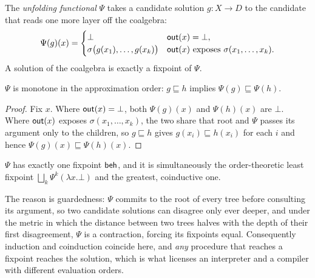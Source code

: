 \begin{definition}\label{def:unfolding}
  The \emph{unfolding functional} $\Psi$ takes a candidate solution $g \colon X \to D$ to the candidate that reads one more layer off the coalgebra:
  \[
    \Psi(g)(x) =
    \begin{cases}
      \bot & \mathsf{out}(x) = \bot,\\
      \sigma\big(g(x_1), \dots, g(x_k)\big) & \mathsf{out}(x) \text{ exposes } \sigma(x_1, \dots, x_k).
    \end{cases}
  \]
  A solution of the coalgebra is exactly a fixpoint of $\Psi$.
\end{definition}

\begin{lemma}\label{lem:mono-coalgebra}
  $\Psi$ is monotone in the approximation order: $g \sqsubseteq h$ implies $\Psi(g) \sqsubseteq \Psi(h)$.
\end{lemma}
\begin{proof}
  Fix $x$. Where $\mathsf{out}(x) = \bot$, both $\Psi(g)(x)$ and $\Psi(h)(x)$ are $\bot$. Where $\mathsf{out}(x)$ exposes $\sigma(x_1, \dots, x_k)$, the two share that root and $\Psi$ passes its argument only to the children, so $g \sqsubseteq h$ gives $g(x_i) \sqsubseteq h(x_i)$ for each $i$ and hence $\Psi(g)(x) \sqsubseteq \Psi(h)(x)$.
\end{proof}

\begin{theorem}\label{thm:unique-coalgebra}
  $\Psi$ has exactly one fixpoint $\mathsf{beh}$, and it is simultaneously the order-theoretic least fixpoint $\bigsqcup_k \Psi^k(\lambda x.\bot)$ and the greatest, coinductive one.
\end{theorem}

\noindent The reason is guardedness: $\Psi$ commits to the root of every tree before consulting its argument, so two candidate solutions can disagree only ever deeper, and under the metric in which the distance between two trees halves with the depth of their first disagreement, $\Psi$
is a contraction, forcing its fixpoints equal. Consequently induction and coinduction coincide here, and \emph{any}
procedure that reaches a fixpoint reaches the solution, which is what licenses an interpreter and a compiler with different evaluation orders.

